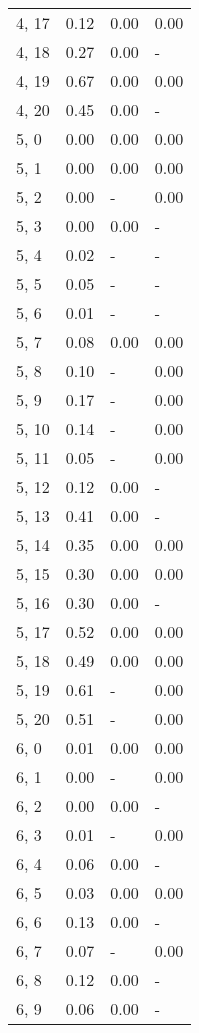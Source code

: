 \begin{table}
\begin{tabular}{llll}
4, 17  &    0.12 &  0.00 &  0.00 \\
4, 18  &    0.27 &  0.00 &     - \\
4, 19  &    0.67 &  0.00 &  0.00 \\
4, 20  &    0.45 &  0.00 &     - \\
5, 0   &    0.00 &  0.00 &  0.00 \\
5, 1   &    0.00 &  0.00 &  0.00 \\
5, 2   &    0.00 &     - &  0.00 \\
5, 3   &    0.00 &  0.00 &     - \\
5, 4   &    0.02 &     - &     - \\
5, 5   &    0.05 &     - &     - \\
5, 6   &    0.01 &     - &     - \\
5, 7   &    0.08 &  0.00 &  0.00 \\
5, 8   &    0.10 &     - &  0.00 \\
5, 9   &    0.17 &     - &  0.00 \\
5, 10  &    0.14 &     - &  0.00 \\
5, 11  &    0.05 &     - &  0.00 \\
5, 12  &    0.12 &  0.00 &     - \\
5, 13  &    0.41 &  0.00 &     - \\
5, 14  &    0.35 &  0.00 &  0.00 \\
5, 15  &    0.30 &  0.00 &  0.00 \\
5, 16  &    0.30 &  0.00 &     - \\
5, 17  &    0.52 &  0.00 &  0.00 \\
5, 18  &    0.49 &  0.00 &  0.00 \\
5, 19  &    0.61 &     - &  0.00 \\
5, 20  &    0.51 &     - &  0.00 \\
6, 0   &    0.01 &  0.00 &  0.00 \\
6, 1   &    0.00 &     - &  0.00 \\
6, 2   &    0.00 &  0.00 &     - \\
6, 3   &    0.01 &     - &  0.00 \\
6, 4   &    0.06 &  0.00 &     - \\
6, 5   &    0.03 &  0.00 &  0.00 \\
6, 6   &    0.13 &  0.00 &     - \\
6, 7   &    0.07 &     - &  0.00 \\
6, 8   &    0.12 &  0.00 &     - \\
6, 9   &    0.06 &  0.00 &     - \\

\end{tabular}
\end{table}
